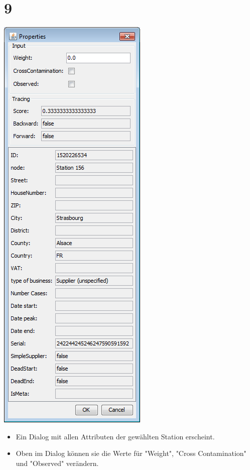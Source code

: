 \documentclass{beamer}
\begin{document}
\section{9}
\begin{frame}
	\begin{center}
  		\includegraphics[height=0.6\textheight]{9.png}
	\end{center}
	\begin{itemize}
		\item Ein Dialog mit allen Attributen der gewählten Station erscheint.
		\item Oben im Dialog können sie die Werte für "Weight", "Cross Contamination" und "Observed" verändern.		
	\end{itemize}
\end{frame}
\end{document}
